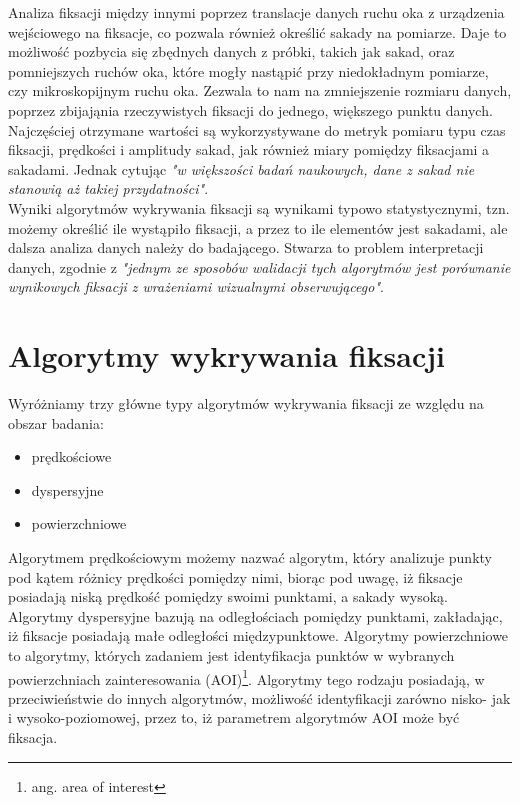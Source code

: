 Analiza fiksacji między innymi poprzez translacje danych ruchu oka z urządzenia wejściowego na fiksacje, co pozwala również określić sakady na pomiarze. Daje to możliwość pozbycia się zbędnych danych z próbki, takich jak sakad, oraz pomniejszych ruchów oka, które mogły nastąpić przy niedokładnym pomiarze, czy mikroskopijnym ruchu oka. Zezwala to nam na zmniejszenie rozmiaru danych, poprzez zbijająnia rzeczywistych fiksacji do jednego, większego punktu danych. Najczęściej otrzymane wartości są wykorzystywane do metryk pomiaru typu czas fiksacji, prędkości i amplitudy sakad, jak również miary pomiędzy fiksacjami a sakadami. Jednak cytując \cite{Main} \emph{"w większości badań naukowych, dane z sakad nie stanowią aż takiej przydatności"}.\\[\baselineskip]
Wyniki algorytmów wykrywania fiksacji są wynikami typowo statystycznymi, tzn. możemy określić ile wystąpiło fiksacji, a przez to ile elementów jest sakadami, ale dalsza analiza danych należy do badającego. Stwarza to problem interpretacji danych, zgodnie z \cite{Main} \emph{"jednym ze sposobów walidacji tych algorytmów jest porównanie wynikowych fiksacji z wrażeniami wizualnymi obserwującego"}.
\section{Algorytmy wykrywania fiksacji}
\label{sec:fixations}
Wyróżniamy trzy główne typy algorytmów wykrywania fiksacji ze względu na obszar badania:
\begin{itemize}
    \item prędkościowe
    \item dyspersyjne
    \item powierzchniowe
\end{itemize} 
Algorytmem prędkościowym możemy nazwać algorytm, który analizuje punkty pod kątem różnicy prędkości pomiędzy nimi, biorąc pod uwagę, iż fiksacje posiadają niską prędkość pomiędzy swoimi punktami, a sakady wysoką. Algorytmy dyspersyjne bazują na odległościach pomiędzy punktami, zakładając, iż fiksacje posiadają małe odległości międzypunktowe. Algorytmy powierzchniowe to algorytmy, których zadaniem jest identyfikacja punktów w wybranych powierzchniach zainteresowania (AOI)\footnote{ang. area of interest}. Algorytmy tego rodzaju posiadają, w przeciwieństwie do innych algorytmów, możliwość identyfikacji zarówno nisko- jak i wysoko-poziomowej, przez to, iż parametrem algorytmów AOI może być fiksacja.\par

